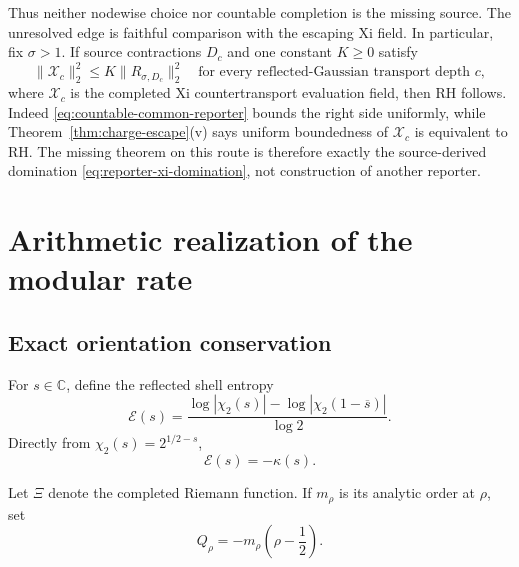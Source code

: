 \documentclass[11pt]{article}
\theoremstyle{definition}
\theoremstyle{remark}
\newcommand{\C}{\mathbb C}
\newcommand{\cE}{\mathcal E}
\begin{document}
Thus neither nodewise choice nor countable completion is the missing source.
The unresolved edge is faithful comparison with the escaping Xi field.  In
particular, fix \(\sigma>1\).  If source contractions \(D_c\) and one
constant \(K\ge0\) satisfy
\[
 \|\mathcal X_c\|_2^2\le
 K\|R_{\sigma,D_c}\|_2^2
 \quad\text{for every reflected-Gaussian transport depth }c,
\tag{3.17}\label{eq:reporter-xi-domination}
\]
where \(\mathcal X_c\) is the completed Xi countertransport evaluation
field, then RH follows.  Indeed
\eqref{eq:countable-common-reporter} bounds the right side uniformly, while
Theorem~\ref{thm:charge-escape}(v) says uniform boundedness of
\(\mathcal X_c\) is equivalent to RH.  The missing theorem on this route is
therefore exactly the source-derived domination
\eqref{eq:reporter-xi-domination}, not construction of another reporter.

\section{Arithmetic realization of the modular rate}

\subsection{Exact orientation conservation}

For \(s\in\C\), define the reflected shell entropy
\[
 \cE(s)=
 \frac{\log|\chi_2(s)|-\log|\chi_2(1-\overline{s})|}
      {\log2}.
\tag{4.1}\label{eq:entropy}
\]
Directly from \(\chi_2(s)=2^{1/2-s}\),
\[
                         \cE(s)=-\kappa(s).
\tag{4.2}\label{eq:entropy-kappa}
\]

Let \(\Xi\) denote the completed Riemann function.  If
\(m_\rho\) is its analytic order at \(\rho\), set
\[
                    Q_\rho=-m_\rho\left(\rho-\frac12\right).
\tag{4.3}\label{eq:charge}
\]
\end{document}
